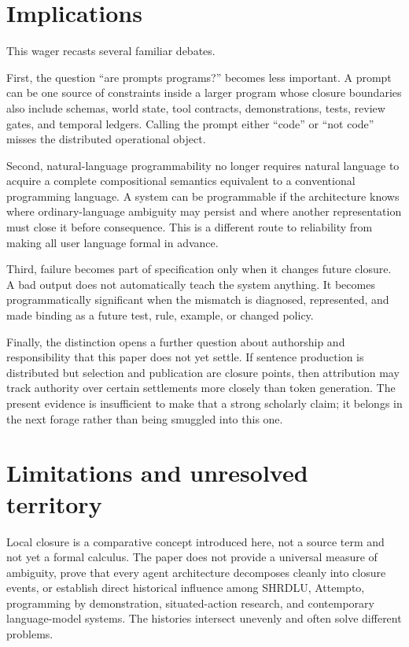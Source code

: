 \documentclass[11pt]{article}
\begin{document}
\section{Implications}
This wager recasts several familiar debates.

First, the question ``are prompts programs?'' becomes less important. A prompt can be one source of constraints inside a larger program whose closure boundaries also include schemas, world state, tool contracts, demonstrations, tests, review gates, and temporal ledgers. Calling the prompt either ``code'' or ``not code'' misses the distributed operational object.

Second, natural-language programmability no longer requires natural language to acquire a complete compositional semantics equivalent to a conventional programming language. A system can be programmable if the architecture knows where ordinary-language ambiguity may persist and where another representation must close it before consequence. This is a different route to reliability from making all user language formal in advance.

Third, failure becomes part of specification only when it changes future closure. A bad output does not automatically teach the system anything. It becomes programmatically significant when the mismatch is diagnosed, represented, and made binding as a future test, rule, example, or changed policy.

Finally, the distinction opens a further question about authorship and responsibility that this paper does not yet settle. If sentence production is distributed but selection and publication are closure points, then attribution may track authority over certain settlements more closely than token generation. The present evidence is insufficient to make that a strong scholarly claim; it belongs in the next forage rather than being smuggled into this one.

\section{Limitations and unresolved territory}
Local closure is a comparative concept introduced here, not a source term and not yet a formal calculus. The paper does not provide a universal measure of ambiguity, prove that every agent architecture decomposes cleanly into closure events, or establish direct historical influence among SHRDLU, Attempto, programming by demonstration, situated-action research, and contemporary language-model systems. The histories intersect unevenly and often solve different problems.
\end{document}
